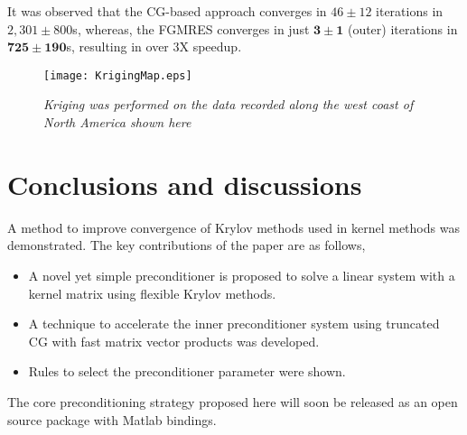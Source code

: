 \documentclass[10pt,journal,letterpaper,compsoc]{IEEEtran}
\begin{document}
It was observed that the CG-based approach converges in $46\pm12$ iterations in $2,301\pm800$s, whereas, the FGMRES converges in just $\mathbf{3\pm1}$ (outer) iterations in $\mathbf{725\pm190}$s, resulting in over $3$X speedup.

\begin{figure}[bth]
\centering
\texttt{[image: KrigingMap.eps]}
\caption{\emph{Kriging was performed on the data recorded along the west coast of North America shown here}\label{fig:KrigingMap}}
\end{figure}

\section{Conclusions and discussions\label{sec:conclusions}}
A method to improve convergence of Krylov methods used in kernel methods was demonstrated. The key contributions of the paper are as follows,
\begin{itemize}
\item A novel yet simple preconditioner is proposed to solve a linear system with a kernel matrix using flexible Krylov methods.
\item A technique to accelerate the inner preconditioner system using truncated CG with fast matrix vector products was developed.
\item Rules to select the preconditioner parameter were shown.
\end{itemize}
The core preconditioning strategy proposed here will soon be released as an open source package with Matlab bindings.
\end{document}
